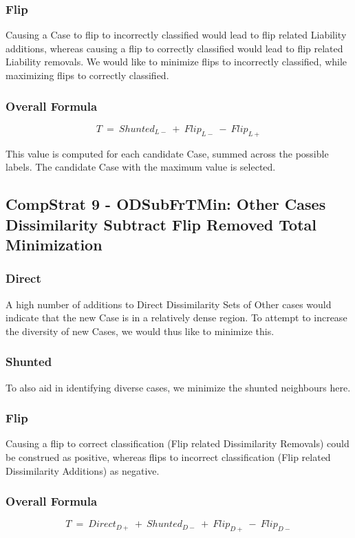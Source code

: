 \documentclass[a4paper,11pt]{report}
\begin{document}
\subsubsection{Flip}
Causing a Case to flip to incorrectly classified would lead to flip related Liability additions, whereas causing a flip to correctly classified would lead to flip related Liability removals. We would like to minimize flips to incorrectly classified, while maximizing flips to correctly classified.

\subsubsection{Overall Formula}
\[  
  T~=~Shunted_{L-}~+~Flip_{L-}~-~Flip_{L+}
\]

This value is computed for each candidate Case, summed across the possible labels. The candidate Case with the maximum value is selected.

\subsection{CompStrat 9 - ODSubFrTMin: Other Cases Dissimilarity Subtract Flip Removed Total Minimization}

\subsubsection{Direct}
A high number of additions to Direct Dissimilarity Sets of Other cases would indicate that the new Case is in a relatively dense region. To attempt to increase the diversity of new Cases, we would thus like to minimize this.

\subsubsection{Shunted}
To also aid in identifying diverse cases, we minimize the shunted neighbours here.

\subsubsection{Flip}
Causing a flip to correct classification (Flip related Dissimilarity Removals) could be construed as positive, whereas flips to incorrect classification (Flip related Dissimilarity Additions) as negative.

\subsubsection{Overall Formula}
\[  
  T~=~Direct_{D+}~+~Shunted_{D-}~+~Flip_{D+}~-~Flip_{D-}
\]
\end{document}
